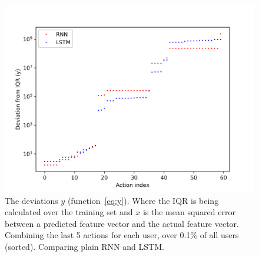 \begin{figure}
	\begin{center}
		\includegraphics[scale=0.8]{experiments/cell/deviations/rnn_vs_lstm}
	\end{center}
	\caption{The deviations \(y\) (function~\ref{eq:y}). Where the IQR is being calculated over the training set and \(x\) is the mean squared error between a predicted feature vector and the actual feature vector. Combining the last 5 actions for each user, over 0.1\% of all users (sorted). Comparing plain RNN and LSTM.~\label{fig:rnn_vs_lstm}}
\end{figure}
